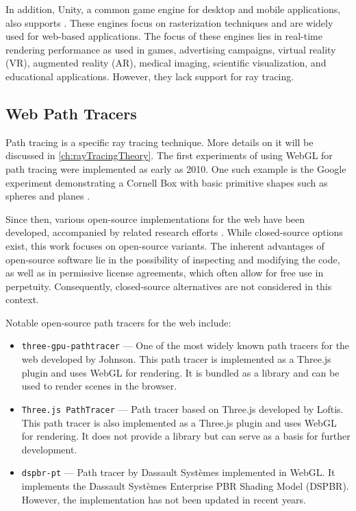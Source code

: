 In addition, \gls{Unity}, a common game engine for desktop and mobile applications, also supports  \cite{unityWebGLCompatibility}. These engines focus on rasterization techniques and are widely used for web-based applications. The focus of these engines lies in real-time rendering performance as used in games, advertising campaigns, virtual reality (VR), augmented reality (AR), medical imaging, scientific visualization, and educational applications. However, they lack support for ray tracing.

\subsection*{Web Path Tracers}
\label{sec:web-path-tracers}

Path tracing is a specific ray tracing technique. More details on it will be discussed in \autoref{ch:rayTracingTheory}. The first experiments of using \gls{WebGL} for path tracing were implemented as early as 2010. One such example is the Google experiment demonstrating a Cornell Box \cite{goral1984modeling} with basic primitive shapes such as spheres and planes \cite{pathTracerWallace}.

Since then, various open-source implementations for the web have been developed, accompanied by related research efforts \cite{academicWebGLPathTracer, academicWebGLPathTracer2}. While closed-source options exist, this work focuses on open-source variants. The inherent advantages of open-source software lie in the possibility of inspecting and modifying the code, as well as in permissive license agreements, which often allow for free use in perpetuity. Consequently, closed-source alternatives are not considered in this context.

Notable open-source path tracers for the web include:

\begin{itemize}
  \item{\texttt{three-gpu-pathtracer}} \cite{ThreeJsPathTracerJohnson} — One of the most widely known path tracers for the web developed by Johnson. This path tracer is implemented as a \gls{Three.js} plugin and uses \gls{WebGL} for rendering.  It is bundled as a library and can be used to render scenes in the browser.
  \item{\texttt{Three.js PathTracer}} \cite{ThreeJsPathTracerLoftis} — Path tracer based on \gls{Three.js} developed by Loftis. This path tracer is also implemented as a \gls{Three.js} plugin and uses \gls{WebGL} for rendering. It does not provide a library but can serve as a basis for further development.
  \item{\texttt{dspbr-pt}} \cite{PathTracerDassault} — Path tracer by Dassault Systèmes implemented in \gls{WebGL}. It implements the Dassault Systèmes Enterprise PBR Shading Model (\gls{DSPBR}). However, the implementation has not been updated in recent years.
\end{itemize}


